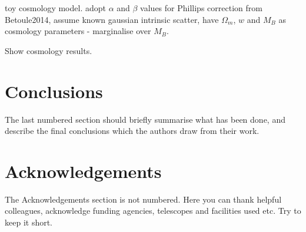 \documentclass[a4paper,fleqn,usenatbib]{mnras}
\begin{document}
toy cosmology model. adopt $\alpha$ and $\beta$ values for Phillips correction from Betoule2014, assume known gaussian intrinsic scatter, have $\Omega_m$, $w$ and $M_B$ as cosmology parameters - marginalise over $M_B$.

Show cosmology results.


%

\section{Conclusions}

The last numbered section should briefly summarise what has been done, and describe
the final conclusions which the authors draw from their work.

\section*{Acknowledgements}

The Acknowledgements section is not numbered. Here you can thank helpful
colleagues, acknowledge funding agencies, telescopes and facilities used etc.
Try to keep it short.


\end{document}
